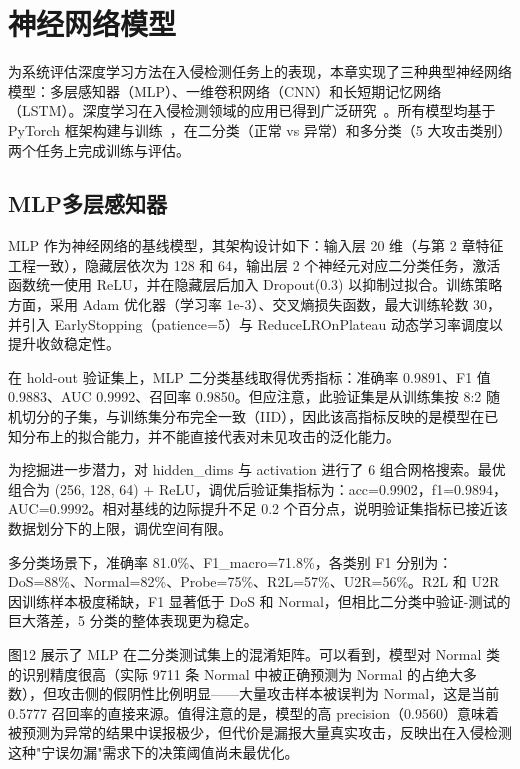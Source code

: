 \section{神经网络模型}

为系统评估深度学习方法在入侵检测任务上的表现，本章实现了三种典型神经网络模型：多层感知器（MLP）、一维卷积网络（CNN）和长短期记忆网络（LSTM）。深度学习在入侵检测领域的应用已得到广泛研究~\cite{jain2026optimizing,alashjaee2025deep,naz2025innovative}。所有模型均基于 PyTorch 框架构建与训练~\cite{pytorch}，在二分类（正常 vs 异常）和多分类（5 大攻击类别）两个任务上完成训练与评估。

\subsection{MLP多层感知器}

MLP 作为神经网络的基线模型，其架构设计如下：输入层 20 维（与第 2 章特征工程一致），隐藏层依次为 128 和 64，输出层 2 个神经元对应二分类任务，激活函数统一使用 ReLU，并在隐藏层后加入 Dropout(0.3) 以抑制过拟合。训练策略方面，采用 Adam 优化器（学习率 1e-3）、交叉熵损失函数，最大训练轮数 30，并引入 EarlyStopping（patience=5）与 ReduceLROnPlateau 动态学习率调度以提升收敛稳定性。

在 hold-out 验证集上，MLP 二分类基线取得优秀指标：准确率 0.9891、F1 值 0.9883、AUC 0.9992、召回率 0.9850。但应注意，此验证集是从训练集按 8:2 随机切分的子集，与训练集分布完全一致（IID），因此该高指标反映的是模型在已知分布上的拟合能力，并不能直接代表对未见攻击的泛化能力。

为挖掘进一步潜力，对 hidden\_dims 与 activation 进行了 6 组合网格搜索。最优组合为 (256, 128, 64) + ReLU，调优后验证集指标为：acc=0.9902，f1=0.9894，AUC=0.9992。相对基线的边际提升不足 0.2 个百分点，说明验证集指标已接近该数据划分下的上限，调优空间有限。

多分类场景下，准确率 81.0\%、F1\_macro=71.8\%，各类别 F1 分别为：DoS=88\%、Normal=82\%、Probe=75\%、R2L=57\%、U2R=56\%。R2L 和 U2R 因训练样本极度稀缺，F1 显著低于 DoS 和 Normal，但相比二分类中验证-测试的巨大落差，5 分类的整体表现更为稳定。

图12 展示了 MLP 在二分类测试集上的混淆矩阵。可以看到，模型对 Normal 类的识别精度很高（实际 9711 条 Normal 中被正确预测为 Normal 的占绝大多数），但攻击侧的假阴性比例明显——大量攻击样本被误判为 Normal，这是当前 0.5777 召回率的直接来源。值得注意的是，模型的高 precision（0.9560）意味着被预测为异常的结果中误报极少，但代价是漏报大量真实攻击，反映出在入侵检测这种"宁误勿漏"需求下的决策阈值尚未最优化。

